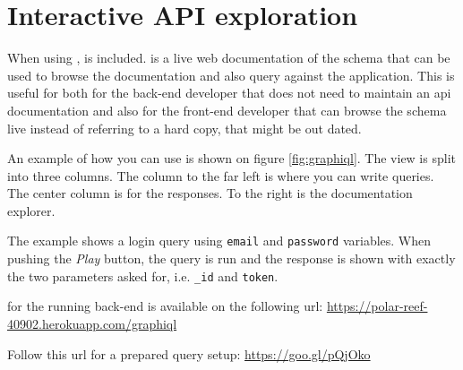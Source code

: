 \section{Interactive API exploration}
When using ,  is included.
 is a live web documentation of the schema that can be used to browse the documentation and also query against the application.
This is useful for both for the back-end developer that does not need to maintain an \gls{api} documentation and also for the front-end developer that can browse the schema live instead of referring to a hard copy, that might be out dated.

An example of how you can use  is shown on figure \ref{fig:graphiql}.
The view is split into three columns.
The column to the far left is where you can write queries.
The center column is for the  responses.
To the right is the documentation explorer.

The example shows a login query using \verb+email+ and \verb+password+ variables.
When pushing the \textit{Play} button, the query is run and the response is shown with exactly the two parameters asked for, i.e. \verb+_id+ and \verb+token+.

 for the running back-end is available on the following \gls{url}: \newline
\url{https://polar-reef-40902.herokuapp.com/graphiql}

Follow this \gls{url} for a prepared query setup: \newline
\url{https://goo.gl/pQjOko}

